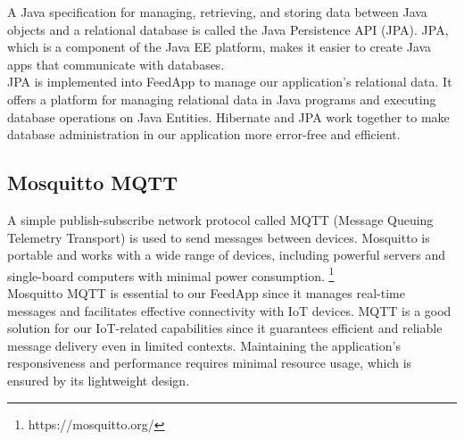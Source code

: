 \noindent A Java specification for managing, retrieving, and storing data between Java objects and a relational database is called the Java Persistence API (JPA). JPA, which is a component of the Java EE platform, makes it easier to create Java apps that communicate with databases. \\

\noindent JPA is implemented into FeedApp to manage our application's relational data. It offers a platform for managing relational data in Java programs and executing database operations on Java Entities. Hibernate and JPA work together to make database administration in our application more error-free and efficient. \\


\subsection{Mosquitto MQTT}

\noindent A simple publish-subscribe network protocol called MQTT (Message Queuing Telemetry Transport) is used to send messages between devices. Mosquitto is portable and works with a wide range of devices, including powerful servers and single-board computers with minimal power consumption. \footnote{https://mosquitto.org/} \\

\noindent Mosquitto MQTT is essential to our FeedApp since it manages real-time messages and facilitates effective connectivity with IoT devices. MQTT is a good solution for our IoT-related capabilities since it guarantees efficient and reliable message delivery even in limited contexts. Maintaining the application's responsiveness and performance requires minimal resource usage, which is ensured by its lightweight design.



